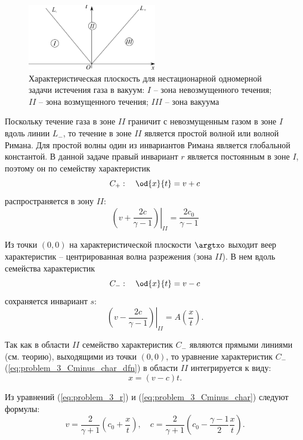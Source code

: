 \documentclass[14pt]{extarticle}
\begin{document}
\begin{figure}
	\centering
	\includegraphics[width=0.5\textwidth]{../img/flow_vacuum_char_plane}
	\caption{Характеристическая плоскость для нестационарной одномерной задачи истечения газа в вакуум: $I$ -- зона невозмущенного течения; $II$ -- зона возмущенного течения; $III$ -- зона вакуума}
	\label{fig:problem_3_characteristic_plane}
\end{figure}




Поскольку течение газа в зоне $II$ граничит с невозмущенным газом в зоне $I$ вдоль линии $L_-$, то течение в зоне $II$ является простой волной или волной Римана. Для простой волны один из инвариантов Римана является глобальной константой. В данной задаче правый инвариант $r$ является постоянным в зоне $I$, поэтому он по семейству характеристик 
\[
C_+:\quad\od{x}{t} = v + c
\]
распространяется в зону $II$:
\begin{equation}
\label{eq:problem_3_r}
\left.\left(v+\frac{2 c}{\gamma-1}\right)\right|_{II} = \frac{2 c_0}{\gamma-1}
\end{equation}

Из точки $(0,0)$ на характеристической плоскости $\argtxo$ выходит веер характеристик -- центрированная волна разрежения (зона $II$). В нем вдоль семейства характеристик
\begin{equation}
	\label{eq:problem_3_Cminus_char_dfn}
C_-:\quad \od{x}{t} = v-c
\end{equation}
сохраняется инвариант $s$: 
\[
\left.\left(v-\frac{2c}{\gamma-1}\right)\right|_{II}=A\left(\frac{x}{t}\right). 
\]

Так как в области $II$ семейство характеристик $C_-$ являются прямыми линиями (см. теорию), выходящими из точки $(0,0)$, то 
уравнение характеристик  $C_-$ (\ref{eq:problem_3_Cminus_char_dfn}) в области $II$ интегрируется к виду:
\begin{equation}
\label{eq:problem_3_Cminus_char}
x = (v-c) t.
\end{equation} 

Из уравнений (\ref{eq:problem_3_r}) и (\ref{eq:problem_3_Cminus_char})  следуют формулы:
\[
v = \frac{2}{\gamma+1}  \left( c_0 + \frac{x}{t} \right),\quad 
c = \frac{2}{\gamma+1}  \left( c_0 - \frac{\gamma-1}{2}\frac{x}{t} \right).
\]
\end{document}
